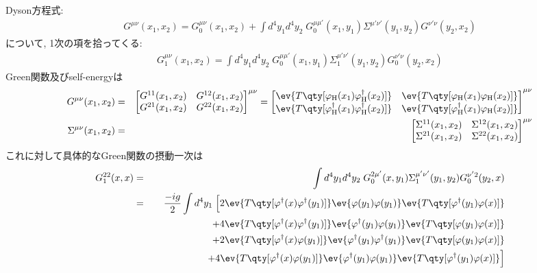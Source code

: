 \documentclass[10.5pt,a4paper]{jreport}
\begin{document}
Dyson方程式:
\begin{eqnarray}
  G^{\mu\nu}(x_1, x_2) = G_0^{\mu\nu}(x_1, x_2) + \int d^4y_1d^4y_2\;G_0^{\mu\mu'}(x_1, y_1)\Sigma^{\mu'\nu'}(y_1, y_2)G^{\nu'\nu}(y_2, x_2)
\end{eqnarray}
について, 1次の項を拾ってくる:
\begin{eqnarray}
  G^{\mu\nu}_1(x_1, x_2) =  \int d^4y_1d^4y_2\;G_0^{\mu\mu'}(x_1, y_1)\Sigma_1^{\mu'\nu'}(y_1, y_2)G_0^{\nu'\nu}(y_2, x_2)
\end{eqnarray}
Green関数及びself-energyは
\begin{eqnarray}
  G^{\mu\nu}(x_1, x_2) &=&
  \begin{bmatrix}
    G^{11}(x_1, x_2)&G^{12}(x_1, x_2)\\
    G^{21}(x_1, x_2)&G^{22}(x_1, x_2)
  \end{bmatrix}^{\mu\nu} =
  \begin{bmatrix}
    \ev{T\qty[\varphi_{\rm H}(x_1)\varphi_{\rm H}^\dagger(x_2)]}&\ev{T\qty[\varphi_{\rm H}(x_1)\varphi_{\rm H}(x_2)]}\\
    \ev{T\qty[\varphi_{\rm H}^\dagger(x_1)\varphi_{\rm H}^\dagger(x_2)]}&\ev{T\qty[\varphi_{\rm H}^\dagger(x_1)\varphi_{\rm H}(x_2)]}
  \end{bmatrix}^{\mu\nu}\\
  \Sigma^{\mu\nu}(x_1, x_2) &=&
  \begin{bmatrix}
    \Sigma^{11}(x_1, x_2)&\Sigma^{12}(x_1, x_2)\\
    \Sigma^{21}(x_1, x_2)&\Sigma^{22}(x_1, x_2)
  \end{bmatrix}^{\mu\nu}
\end{eqnarray}
これに対して具体的なGreen関数の摂動一次は
\begin{eqnarray}
  \nonumber  G^{22}_1(x, x) &=& \int d^4y_1d^4y_2\;G_0^{2\mu'}(x, y_1)\Sigma_1^{\mu'\nu'}(y_1, y_2)G_0^{\nu'2}(y_2, x)\\
  \nonumber  &=& \frac{-ig}{2}\int d^4y_1\; \Bigl[2\ev{T\qty[\varphi^\dagger(x)\varphi^\dagger(y_1)]}\ev{\varphi(y_1)\varphi(y_1)}\ev{T\qty[\varphi^\dagger(y_1)\varphi(x)]}\\
    \nonumber    &&\hspace{2cm}+4\ev{T\qty[\varphi^\dagger(x)\varphi^\dagger(y_1)]}\ev{\varphi^\dagger(y_1)\varphi(y_1)}\ev{T\qty[\varphi(y_1)\varphi(x)]}\\
    &&\hspace{2cm}+2\ev{T\qty[\varphi^\dagger(x)\varphi(y_1)]}\ev{\varphi^\dagger(y_1)\varphi^\dagger(y_1)}\ev{T\qty[\varphi(y_1)\varphi(x)]}\\
    &&\hspace{2cm}+ 4\ev{T\qty[\varphi^\dagger(x)\varphi(y_1)]}\ev{\varphi^\dagger(y_1)\varphi(y_1)}\ev{T\qty[\varphi^\dagger(y_1)\varphi(x)]}
    \Bigr]
\end{eqnarray}
\end{document}
